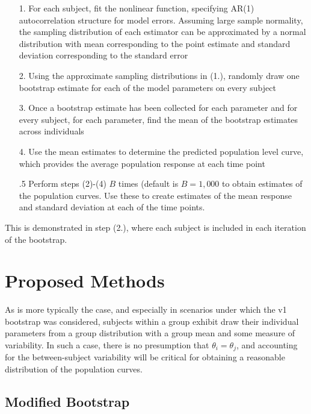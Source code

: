 \documentclass{article}
\begin{document}
\begin{singlespace}
\begin{enumerate}
\vspace{-3mm}
\item[1.] For each subject, fit the nonlinear function, specifying AR(1) autocorrelation structure for model errors. Assuming large sample normality, the sampling distribution of each estimator can be approximated by a normal distribution with mean corresponding to the point estimate and standard deviation corresponding to the standard error

\item[2.] Using the approximate sampling distributions in (1.), randomly draw one bootstrap estimate for each of the model parameters on every subject

\item[3.] Once a bootstrap estimate has been collected for each parameter and for every subject, for each parameter, find the mean of the bootstrap estimates across individuals

\item[4.] Use the mean estimates to determine the predicted population level curve, which provides the average population response at each time point

\item[.5] Perform steps (2)-(4) $B$ times (default is $B = 1,000$ to obtain estimates of the population curves. Use these to create estimates of the mean response and standard deviation at each of the time points. 
\end{enumerate}
\end{singlespace}

This is demonstrated in step (2.), where each subject is included in each iteration of the bootstrap.


\section{Proposed Methods}

As is more typically the case, and especially in scenarios under which the v1 bootstrap was considered, subjects within a group exhibit draw their individual parameters from a group distribution with a group mean and some measure of variability. In such a case, there is no presumption that $\theta_i = \theta_j$, and accounting for the between-subject variability will be critical for obtaining a reasonable distribution of the population curves.

\subsection{Modified Bootstrap}
\end{document}
